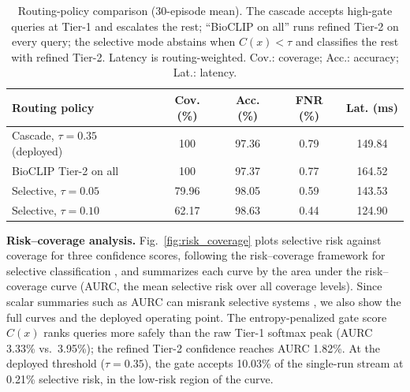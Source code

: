 \documentclass[preprint,12pt]{elsarticle}
\begin{document}
\begin{table}[htbp]
\centering
\caption{Routing-policy comparison (30-episode mean). The cascade accepts high-gate queries at Tier-1 and escalates the rest; ``BioCLIP on all'' runs refined Tier-2 on every query; the selective mode abstains when $C(x)<\tau$ and classifies the rest with refined Tier-2. Latency is routing-weighted. Cov.: coverage; Acc.: accuracy; Lat.: latency.}
\label{tab:gate_scenario}
\footnotesize
\setlength{\tabcolsep}{3pt}
\begin{tabular*}{\columnwidth}{@{\extracolsep{\fill}}lcccc}
\toprule
\textbf{Routing policy} & \textbf{Cov. (\%)} & \textbf{Acc. (\%)} & \textbf{FNR (\%)} & \textbf{Lat. (ms)} \\
\midrule
Cascade, $\tau=0.35$ (deployed) & 100 & 97.36 & 0.79 & 149.84 \\
BioCLIP Tier-2 on all & 100 & 97.37 & 0.77 & 164.52 \\
Selective, $\tau=0.05$ & 79.96 & 98.05 & 0.59 & 143.53 \\
Selective, $\tau=0.10$ & 62.17 & 98.63 & 0.44 & 124.90 \\
\bottomrule
\end{tabular*}
\end{table}

\textbf{Risk--coverage analysis.} Fig.~\ref{fig:risk_coverage} plots selective risk against coverage for three confidence scores, following the risk--coverage framework for selective classification \cite{geifman2017selective}, and summarizes each curve by the area under the risk--coverage curve (AURC, the mean selective risk over all coverage levels). Since scalar summaries such as AURC can misrank selective systems \cite{traub2024overcoming}, we also show the full curves and the deployed operating point. The entropy-penalized gate score $C(x)$ ranks queries more safely than the raw Tier-1 softmax peak (AURC 3.33\% vs.\ 3.95\%); the refined Tier-2 confidence reaches AURC 1.82\%. At the deployed threshold ($\tau=0.35$), the gate accepts 10.03\% of the single-run stream at 0.21\% selective risk, in the low-risk region of the curve.
\end{document}
